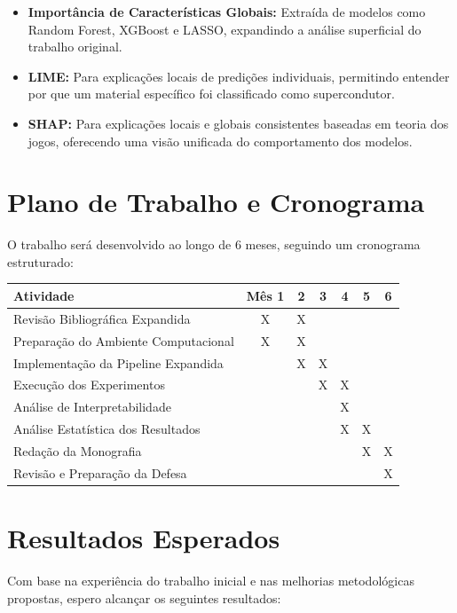 \documentclass[12pt, a4paper]{article}
\begin{document}
\begin{itemize}
    \item \textbf{Importância de Características Globais:} Extraída de modelos como Random Forest, XGBoost e LASSO, expandindo a análise superficial do trabalho original.
    \item \textbf{LIME:} Para explicações locais de predições individuais, permitindo entender por que um material específico foi classificado como supercondutor.
    \item \textbf{SHAP:} Para explicações locais e globais consistentes baseadas em teoria dos jogos, oferecendo uma visão unificada do comportamento dos modelos.
\end{itemize}

\section{Plano de Trabalho e Cronograma}

O trabalho será desenvolvido ao longo de 6 meses, seguindo um cronograma estruturado:

\begin{center}
\begin{tabular}{|l|c|c|c|c|c|c|}
\hline
\textbf{Atividade} & \textbf{Mês 1} & \textbf{2} & \textbf{3} & \textbf{4} & \textbf{5} & \textbf{6} \\
\hline
Revisão Bibliográfica Expandida & X & X & & & & \\
\hline
Preparação do Ambiente Computacional & X & X & & & & \\
\hline
Implementação da Pipeline Expandida & & X & X & & & \\
\hline
Execução dos Experimentos & & & X & X & & \\
\hline
Análise de Interpretabilidade & & & & X & & \\
\hline
Análise Estatística dos Resultados & & & & X & X & \\
\hline
Redação da Monografia & & & & & X & X \\
\hline
Revisão e Preparação da Defesa & & & & & & X \\
\hline
\end{tabular}
\end{center}

\section{Resultados Esperados}

Com base na experiência do trabalho inicial e nas melhorias metodológicas propostas, espero alcançar os seguintes resultados:
\end{document}

